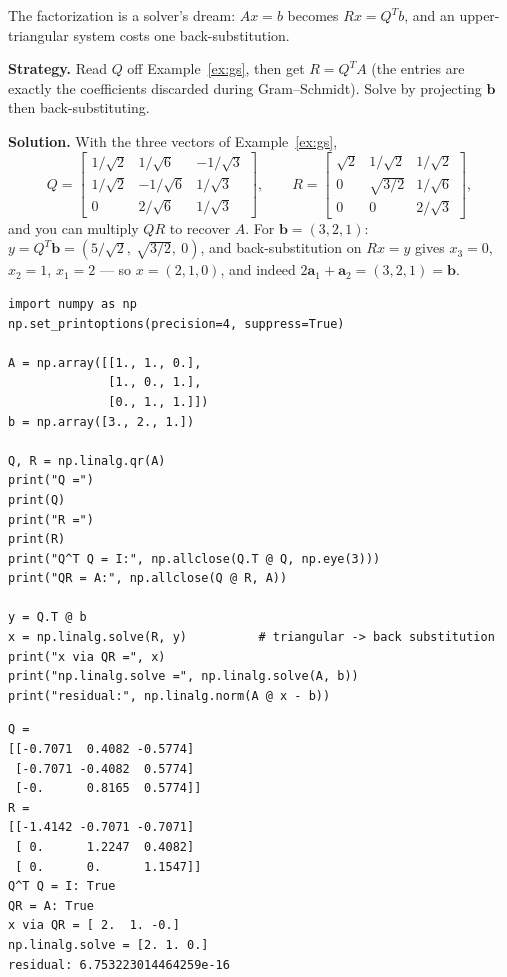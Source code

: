 The factorization is a solver's dream: $Ax=b$ becomes $Rx=Q^{T}b$, and an
upper-triangular system costs one back-substitution.

\begin{example}[QR and solving $Ax=b$]\label{ex:qr}
\textbf{Strategy.} Read $Q$ off Example~\ref{ex:gs}, then get $R=Q^{T}A$
(the entries are exactly the coefficients discarded during Gram--Schmidt).
Solve by projecting $\mathbf b$ then back-substituting.

\textbf{Solution.} With the three vectors of Example~\ref{ex:gs},
\[
Q=\begin{bmatrix}1/\sqrt2&1/\sqrt6&-1/\sqrt3\\
1/\sqrt2&-1/\sqrt6&1/\sqrt3\\0&2/\sqrt6&1/\sqrt3\end{bmatrix},
\qquad
R=\begin{bmatrix}\sqrt2&1/\sqrt2&1/\sqrt2\\
0&\sqrt{3/2}&1/\sqrt6\\0&0&2/\sqrt3\end{bmatrix},
\]
and you can multiply $QR$ to recover $A$. For $\mathbf b=(3,2,1)$:
$y=Q^{T}\mathbf b=(5/\sqrt2,\ \sqrt{3/2},\ 0)$, and back-substitution on
$Rx=y$ gives $x_3=0$, $x_2=1$, $x_1=2$ --- so $x=(2,1,0)$, and indeed
$2\mathbf a_1+\mathbf a_2=(3,2,1)=\mathbf b$.
\end{example}

\begin{lstlisting}[caption={\ttfamily code/ch05\_qr\_solve.py --- factors the
same $3\times3$ with \ttfamily np.linalg.qr and solves $Ax=b$ via
$y=Q^{T}b$ and back-substitution. Sign convention: \ttfamily numpy returns
negative diagonal $R$ (both conventions are valid QR factorizations --- it
is $Q$'s sign that flips to compensate).}]
import numpy as np
np.set_printoptions(precision=4, suppress=True)

A = np.array([[1., 1., 0.],
              [1., 0., 1.],
              [0., 1., 1.]])
b = np.array([3., 2., 1.])

Q, R = np.linalg.qr(A)
print("Q =")
print(Q)
print("R =")
print(R)
print("Q^T Q = I:", np.allclose(Q.T @ Q, np.eye(3)))
print("QR = A:", np.allclose(Q @ R, A))

y = Q.T @ b
x = np.linalg.solve(R, y)          # triangular -> back substitution
print("x via QR =", x)
print("np.linalg.solve =", np.linalg.solve(A, b))
print("residual:", np.linalg.norm(A @ x - b))
\end{lstlisting}

\begin{lstlisting}[caption={Output of the QR solve. Notice the two
conventions agree on everything that matters: $Q^{T}Q=I$, $QR=A$, and the
same $x=(2,1,0)$ as the hand computation.}]
Q =
[[-0.7071  0.4082 -0.5774]
 [-0.7071 -0.4082  0.5774]
 [-0.      0.8165  0.5774]]
R =
[[-1.4142 -0.7071 -0.7071]
 [ 0.      1.2247  0.4082]
 [ 0.      0.      1.1547]]
Q^T Q = I: True
QR = A: True
x via QR = [ 2.  1. -0.]
np.linalg.solve = [2. 1. 0.]
residual: 6.753223014464259e-16
\end{lstlisting}

